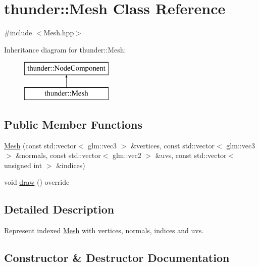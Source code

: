 \hypertarget{classthunder_1_1_mesh}{}\section{thunder\+:\+:Mesh Class Reference}
\label{classthunder_1_1_mesh}


{\ttfamily \#include $<$Mesh.\+hpp$>$}

Inheritance diagram for thunder\+:\+:Mesh\+:\begin{figure}[H]
\begin{center}
\leavevmode
\includegraphics[height=2.000000cm]{classthunder_1_1_mesh}
\end{center}
\end{figure}
\subsection*{Public Member Functions}
\begin{DoxyCompactItemize}
\item 
\mbox{\hyperlink{classthunder_1_1_mesh_ac5b6ef13b76f1775d31df125677b4bda}{Mesh}} (const std\+::vector$<$ glm\+::vec3 $>$ \&vertices, const std\+::vector$<$ glm\+::vec3 $>$ \&normals, const std\+::vector$<$ glm\+::vec2 $>$ \&uvs, const std\+::vector$<$ unsigned int $>$ \&indices)
\item 
void \mbox{\hyperlink{classthunder_1_1_mesh_a08bdbe48d3f9244d6b6a8edc81d34ee4}{draw}} () override
\end{DoxyCompactItemize}


\subsection{Detailed Description}
Represent indexed \mbox{\hyperlink{classthunder_1_1_mesh}{Mesh}} with vertices, normals, indices and uvs. 

\subsection{Constructor \& Destructor Documentation}
\mbox{\label{classthunder_1_1_mesh_ac5b6ef13b76f1775d31df125677b4bda}} 
